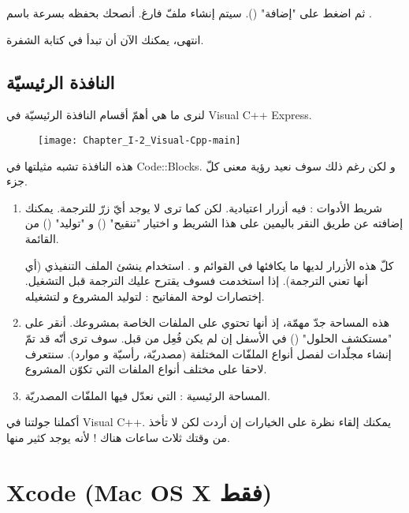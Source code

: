 ثم اضغط على
"إضافة"
().
سيتم إنشاء ملفّ فارغ. أنصحك بحفظه بسرعة باسم
.

انتهى، يمكنك الآن أن تبدأ في كتابة الشفرة.

\subsection{النافذة الرئيسيّة}

لنرى ما هي أهمّ أقسام النافذة الرئيسيّة في
\textenglish{Visual C++ Express}.

\begin{figure}[H]
	\centering
	\texttt{[image: Chapter\_I-2\_Visual-Cpp-main]}
\end{figure}

هذه النافذة تشبه مثيلتها في
\textenglish{Code::Blocks}.
و لكن رغم ذلك سوف نعيد رؤية معنى كلّ جزء.

\begin{enumerate}
  \item شريط الأدوات : فيه أزرار اعتيادية. لكن كما ترى لا يوجد أيّ زرّ للترجمة. يمكنك إضافته عن طريق النقر باليمين على هذا الشريط و اختيار
"تنقيح"
()
و
"توليد"
()
من القائمة.

كلّ هذه الأزرار لديها ما يكافئها في القوائم
و
.
استخدام
ينشئ الملف التنفيذي (أي أنها تعني الترجمة). إذا استخدمت
فسوف يقترح عليك الترجمة قبل التشغيل. إختصارات لوحة المفاتيح :
لتوليد المشروع و
لتشغيله.
  \item هذه المساحة جدّ مهمّة، إذ أنها تحتوي على الملفات الخاصة بمشروعك. أنقر على
"مستكشف الحلول"
()
في الأسفل إن لم يكن فُعِل من قبل. سوف ترى أنّه قد تمّ إنشاء مجلّدات لفصل أنواع الملفّات المختلفة (مصدريّة، رأسيّة و موارد). سنتعرف لاحقا على مختلف أنواع الملفات التي تكوّن المشروع.
  \item المساحة الرئيسية : التي نعدّل فيها الملفّات المصدريّة.
\end{enumerate}

أكملنا جولتنا في
\textenglish{Visual C++}.
يمكنك إلقاء نظرة على
الخيارات
إن أردت لكن لا تأخذ من وقتك ثلاث ساعات هناك ! لأنه يوجد كثير منها.

\section{\textenglish{Xcode} (\textenglish{Mac OS X} فقط)}

